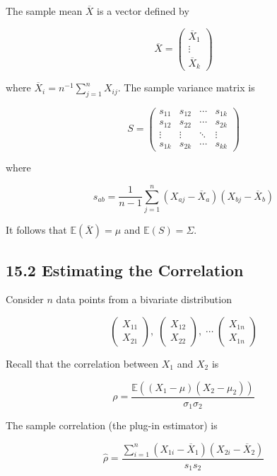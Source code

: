 The sample mean \(\overline{X}\) is a vector defined by

\[\overline{X} = \begin{pmatrix} \overline{X}_1 \\ \vdots \\ \overline{X}_k \end{pmatrix}\]

where \(\overline{X}_i = n^{-1} \sum_{j = 1}^n X_{ij}\). The sample
variance matrix is

\[ S = \begin{pmatrix} 
s_{11} & s_{12} & \cdots & s_{1k} \\
s_{12} & s_{22} & \cdots & s_{2k} \\
\vdots & \vdots & \ddots & \vdots \\
s_{1k} & s_{2k} & \cdots & s_{kk}
\end{pmatrix} \]

where

\[s_{ab} = \frac{1}{n - 1} \sum_{j = 1}^n (X_{aj} - \overline{X}_a) (X_{bj} - \overline{X}_b)\]

It follows that \(\mathbb{E}(\overline{X}) = \mu\) and
\(\mathbb{E}(S) = \Sigma\).

\subsection{15.2 Estimating the
Correlation}\label{estimating-the-correlation}

Consider \(n\) data points from a bivariate distribution

\[
\begin{pmatrix} X_{11} \\ X_{21}\end{pmatrix}, \;
\begin{pmatrix} X_{12} \\ X_{22}\end{pmatrix}, \;
\cdots \;
\begin{pmatrix} X_{1n} \\ X_{1n}\end{pmatrix}
\]

Recall that the correlation between \(X_1\) and \(X_2\) is

\[\rho = \frac{\mathbb{E}((X_1 - \mu) (X_2 - \mu_2))}{\sigma_1 \sigma_2}\]

The sample correlation (the plug-in estimator) is

\[\hat{\rho} = \frac{\sum_{i=1}^n (X_{1i} - \overline{X}_1)(X_{2i} - \overline{X}_2)}{s_1 s_2}\]

